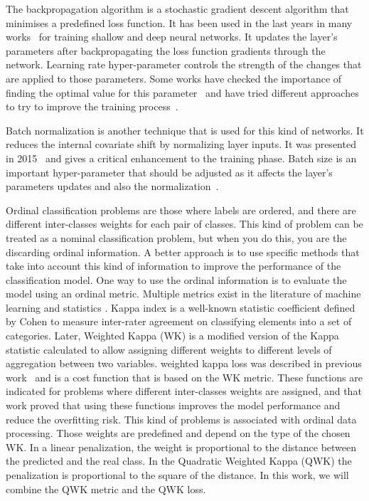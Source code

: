 \documentclass[journal]{IEEEtran}
\begin{document}
	The backpropagation algorithm is a stochastic gradient descent algorithm that minimises a predefined loss function. It has been used in the last years in many works~\cite{leonard1990improvement, yu1995dynamic, krizhevsky2012imagenet, de2018weighted} for training shallow and deep neural networks. It updates the layer's parameters after backpropagating the loss function gradients through the network. Learning rate hyper-parameter controls the strength of the changes that are applied to those parameters. Some works have checked the importance of finding the optimal value for this parameter~\cite{senior2013empirical} and have tried different approaches to try to improve the training process~\cite{smith2017cyclical}.
	
	Batch normalization is another technique that is used for this kind of networks. It reduces the internal covariate shift by normalizing layer inputs. It was presented in 2015~\cite{ioffe2015batch} and gives a critical enhancement to the training phase. Batch size is an important hyper-parameter that should be adjusted as it affects the layer's parameters updates and also the normalization~\cite{keskar2016large}\cite{radiuk2017impact}.
	
	Ordinal classification problems are those where labels are ordered, and there are different inter-classes weights for each pair of classes. This kind of problem can be treated as a nominal classification problem, but when you do this, you are the discarding ordinal information. A better approach is to use specific methods that take into account this kind of information to improve the performance of the classification model. One way to use the ordinal information is to evaluate the model using an ordinal metric. Multiple metrics exist in the literature of machine learning and statistics \cite{cruz2014metrics, mehdiyev2016evaluating}. Kappa index is a well-known statistic coefficient defined by Cohen \cite{cohen1960coefficient} to measure inter-rater agreement on classifying elements into a set of categories. Later, Weighted Kappa (WK) is a modified version of the Kappa statistic calculated to allow assigning different weights to different levels of aggregation between two variables. weighted kappa loss was described in previous work~\cite{de2018weighted} and is a cost function that is based on the WK metric. These functions are indicated for problems where different inter-classes weights are assigned, and that work proved that using these functions improves the model performance and reduce the overfitting risk. This kind of problems is associated with ordinal data processing. Those weights are predefined and depend on the type of the chosen WK. In a linear penalization, the weight is proportional to the distance between the predicted and the real class. In the Quadratic Weighted Kappa (QWK) the penalization is proportional to the square of the distance. In this work, we will combine the QWK metric and the QWK loss.
	
\end{document}

